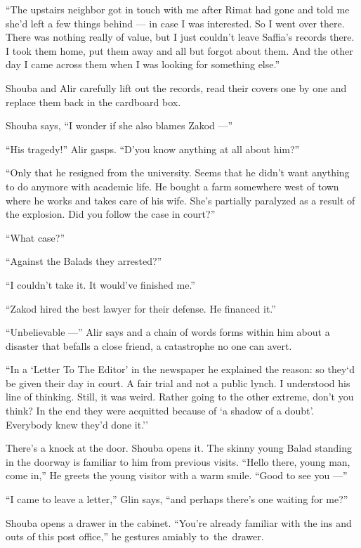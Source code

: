 \documentclass[twoside,11pt,openany]{book}
\begin{document}
``The upstairs neighbor got in touch with me after Rimat had gone and told me she'd left a few things
behind --- in case I was interested. So I went over there. There was nothing really of value, but I just couldn't leave
Saffia's records there. I took them home, put them away and all but forgot about them. And the other day I came across
them when I was looking for something else.''

Shouba and Alir carefully lift out the records, read their covers one by one and replace them back in the cardboard
box.

Shouba says, ``I wonder if she also blames Zakod ---''

``His tragedy!'' Alir gasps. ``D'you know anything at all about
him?''

``Only that he resigned from the university. Seems that he didn't want
anything to do anymore with academic life. He
bought a farm somewhere west of town where he works and takes care of his wife. She's partially paralyzed as a result
of the explosion. Did you follow the case in court?''

``What case?''

``Against the Balads they arrested?''

``I couldn't take it. It would've finished me.''

``Zakod hired the best lawyer for their defense. He financed it.''

``Unbelievable ---'' Alir says and a chain of words forms within him about a disaster that
befalls a close friend, a catastrophe no one can avert.

``In a `Letter To The Editor' in the newspaper he explained the reason: so they`d be given their day
in court. A fair trial and not a public lynch. I understood his line of thinking. Still, it was weird. Rather going to
the other extreme, don't you think?{  }In the end they were acquitted because
of `a shadow of a doubt'. Everybody knew they'd done it.''

There's a knock at the door. Shouba opens it. The skinny young Balad standing in the doorway is familiar to him from
previous visits. ``Hello there, young man, come in,'' He greets the young visitor with a
warm smile. ``Good to see you ---''

``I came to leave a letter,'' Glin says, ``and perhaps there's one waiting for
me?''

Shouba opens a drawer in the cabinet. ``You're already familiar with the ins and outs of this post
office,'' he gestures amiably to~the~drawer.
\end{document}

